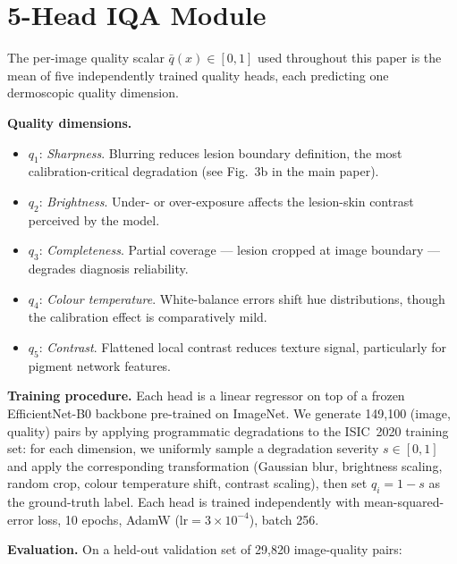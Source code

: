 \documentclass{bmvc2k}
\newcommand{\qbar}{\bar{q}}
\begin{document}
\section{5-Head IQA Module}
\label{app:iqa}

The per-image quality scalar $\qbar(x) \in [0,1]$ used throughout this paper is the mean of five independently trained quality heads, each predicting one dermoscopic quality dimension.

\textbf{Quality dimensions.}
\begin{itemize}[leftmargin=*,itemsep=2pt]
  \item $q_1$: \emph{Sharpness}. Blurring reduces lesion boundary definition, the most calibration-critical degradation (see Fig.~3b in the main paper).
  \item $q_2$: \emph{Brightness}. Under- or over-exposure affects the lesion-skin contrast perceived by the model.
  \item $q_3$: \emph{Completeness}. Partial coverage — lesion cropped at image boundary — degrades diagnosis reliability.
  \item $q_4$: \emph{Colour temperature}. White-balance errors shift hue distributions, though the calibration effect is comparatively mild.
  \item $q_5$: \emph{Contrast}. Flattened local contrast reduces texture signal, particularly for pigment network features.
\end{itemize}

\textbf{Training procedure.}
Each head is a linear regressor on top of a frozen EfficientNet-B0 backbone pre-trained on ImageNet. We generate 149,100 (image, quality) pairs by applying programmatic degradations to the ISIC~2020 training set: for each dimension, we uniformly sample a degradation severity $s \in [0,1]$ and apply the corresponding transformation (Gaussian blur, brightness scaling, random crop, colour temperature shift, contrast scaling), then set $q_i = 1 - s$ as the ground-truth label. Each head is trained independently with mean-squared-error loss, 10 epochs, AdamW ($\text{lr}{=}3{\times}10^{-4}$), batch 256.

\textbf{Evaluation.}
On a held-out validation set of 29,820 image-quality pairs:
\end{document}

